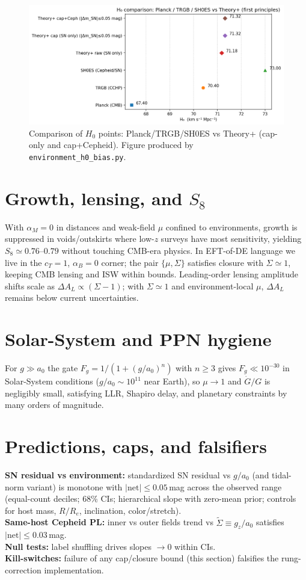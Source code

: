 \documentclass[aps,prd,preprint,onecolumn,longbibliography,nofootinbib]{revtex4-2}
\theoremstyle{plain}
\theoremstyle{remark}
\newcommand{\Hzero}{H_0}
\newcommand{\alM}{\alpha_{\!M}}
\newcommand{\alB}{\alpha_{\!B}}
\newcommand{\Sig}{\Sigma} %
\begin{document}
\begin{figure}[t]
  \centering
  \includegraphics[width=0.9\linewidth]{./outputs_paper_ready/H0_points_theoryplus.png}
  \caption{Comparison of $\Hzero$ points: Planck/TRGB/SH0ES vs Theory+ (cap-only and cap+Cepheid). Figure produced by \texttt{environment\_h0\_bias.py}.}
\end{figure}

\section{Growth, lensing, and \texorpdfstring{$S_8$}{S8}}\label{sec:lensing_closure}
With $\alM=0$ in distances and weak-field $\mu$ confined to environments, growth is suppressed in voids/outskirts where low-$z$ surveys have most sensitivity, yielding $S_8 \simeq 0.76$–$0.79$ without touching CMB-era physics. In EFT-of-DE language we live in the $c_T\!=\!1$, $\alB\!=\!0$ corner; the pair $\{\mu,\Sig\}$ satisfies closure with $\Sig\simeq 1$, keeping CMB lensing and ISW within bounds. Leading-order lensing amplitude shifts scale as $\Delta A_L\!\propto\!(\Sig\!-\!1)$; with $\Sig\simeq 1$ and environment-local $\mu$, $\Delta A_L$ remains below current uncertainties.

\section{Solar-System and PPN hygiene}
For $g\!\gg\! a_0$ the gate $F_g=1/(1+(g/a_0)^n)$ with $n\!\ge\!3$ gives $F_g\!\ll\!10^{-30}$ in Solar-System conditions ($g/a_0\!\sim\!10^{11}$ near Earth), so $\mu\!\to\!1$ and $\dot G/G$ is negligibly small, satisfying LLR, Shapiro delay, and planetary constraints by many orders of magnitude.

\section{Predictions, caps, and falsifiers}\label{sec:falsifiers}
\textbf{SN residual vs environment:} standardized SN residual vs $g/a_0$ (and tidal-norm variant) is monotone with $|\text{net}|\le 0.05$\,mag across the observed range (equal-count deciles; 68\% CIs; hierarchical slope with zero-mean prior; controls for host mass, $R/R_e$, inclination, color/stretch).\\
\textbf{Same-host Cepheid PL:} inner vs outer fields trend vs $\tilde{\Sigma}\!\equiv\!g_z/a_0$ satisfies $|\text{net}|\le 0.03$\,mag.\\
\textbf{Null tests:} label shuffling drives slopes $\to 0$ within CIs.\\
\textbf{Kill-switches:} failure of any cap/closure bound (this section) falsifies the rung-correction implementation.
\end{document}
